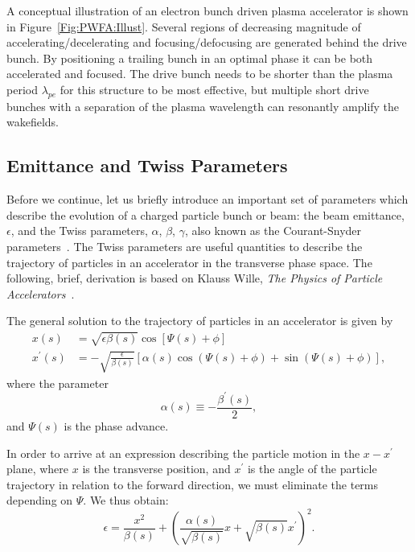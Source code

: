 A conceptual illustration of an electron bunch driven plasma accelerator is shown in Figure~\ref{Fig:PWFA:Illust}.
Several regions of decreasing magnitude of accelerating\slash decelerating and focusing\slash defocusing are generated behind the drive bunch.
By positioning a trailing bunch in an optimal phase it can be both accelerated and focused.
The drive bunch needs to be shorter than the plasma period $\lambda_{pe}$ for this structure to be most effective, but multiple short drive bunches with a separation of the plasma wavelength can resonantly amplify the wakefields.

\subsection{Emittance and Twiss Parameters}
\label{Int:BPI:EnTwiss}

Before we continue, let us briefly introduce an important set of parameters which describe the evolution of a charged particle bunch or beam: the beam emittance, $\epsilon$, and the Twiss parameters, $\alpha$, $\beta$, $\gamma$, also known as the Courant-Snyder parameters~\cite{courant:1958}.
The Twiss parameters are useful quantities to describe the trajectory of particles in an accelerator in the transverse phase space.
The following, brief, derivation is based on Klauss Wille, \textit{The Physics of Particle Accelerators}~\cite{wille:2001}.

The general solution to the trajectory of particles in an accelerator is given by
\begin{align}
    x(s)          &=  \sqrt{\epsilon\beta(s)} \cos\left[\Psi(s) + \phi\right] \label{EQ:PTrajX} \\
    x^{\prime}(s) &= -\sqrt{\frac{\epsilon}{\beta(s)}}
                     \left[\alpha(s)\cos\left(\Psi(s) + \phi\right) + \sin\left(\Psi(s) + \phi\right)\right], \label{EQ:PTrajXP}
\end{align}
where the parameter
\begin{equation}
    \alpha(s) \equiv -\frac{\beta^{\prime}(s)}{2}, \label{EQ:TwissAlpha}
\end{equation}
and $\Psi(s)$ is the phase advance.

In order to arrive at an expression describing the particle motion in the $x-x^\prime$ plane, where $x$ is the transverse position, and $x^\prime$ is the angle of the particle trajectory in relation to the forward direction, we must eliminate the terms depending on $\Psi$.
We thus obtain:
\begin{equation}
    \epsilon = \frac{x^2}{\beta(s)} + \left(\frac{\alpha(s)}{\sqrt{\beta(s)}}x + \sqrt{\beta(s)}x^{\prime}\right)^2.
\end{equation}


